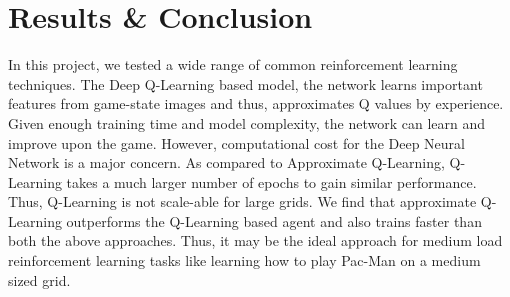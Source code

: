 \documentclass[10pt,twocolumn,letterpaper]{article}
\begin{document}
\section{Results \& Conclusion}
In this project, we tested a wide range of common reinforcement learning techniques. The Deep Q-Learning based model, the network learns important features from game-state images and thus, approximates Q values by experience. Given enough training time and model complexity, the network can learn and improve upon the game. However, computational cost for the Deep Neural Network is a major concern. As compared to Approximate Q-Learning, Q-Learning takes a much larger number of epochs to gain similar performance. Thus, Q-Learning is not scale-able for large grids.  We find that approximate Q-Learning outperforms the Q-Learning based agent and also trains faster than both the above approaches. Thus, it may be the ideal approach for medium load reinforcement learning tasks like learning how to play Pac-Man on a medium sized grid.\\
\end{document}
